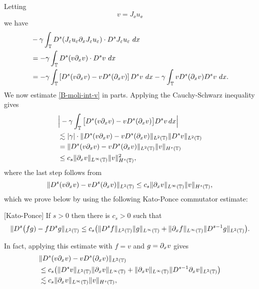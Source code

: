 Letting 
%
\begin{equation} 
\label{v-Je-ue}
v=J_\ee u_\ee
\end{equation}
%
%
we have
%
\begin{equation} 
\begin{split}
\label{B-moli-int-v}
& -  \gamma \int_{\mathbb{T}}   D^s (J_{\varepsilon} u_{\varepsilon} \partial_x J_\varepsilon u_\varepsilon)
\cdot D^s
J_{\varepsilon}u_\varepsilon \ dx  
\\
& = - \gamma \int_{\mathbb{T}}
D^s(v \partial_x v) \cdot   D^s v \ dx
\\
& = - \gamma \int_{\mathbb{T}}
\left [ 
D^s(v\partial_x v)  -  v D^s (\partial_xv)
\right ] 
D^s v \ dx - \gamma \int_{\mathbb{T}}
v D^s (\partial_xv)
D^s v \ dx.
\end{split}
\end{equation}
%
%
%
We now estimate \eqref{B-moli-int-v} in parts. Applying the Cauchy-Schwarz inequality gives
%
\begin{equation} 
\label{int1-est-calc2}
\begin{split}
& \Big|
- \gamma \int_{\mathbb{T}}
\big[ 
D^s(v\partial_x v)  -  v D^s (\partial_xv)
\big]
D^s v   \, dx
\Big|
\\
& \lesssim
|\gamma| \cdot \|
D^s(v\partial_x v)  -  v D^s (\partial_xv)
\|_{L^2(\mathbb{T})}
\|
D^s v 
\|_{L^2(\mathbb{T})}
\\
& = 
  \|
D^s(v\partial_x v)  -  v D^s (\partial_xv)
\|_{L^2(\mathbb{T})}
\|
v
\|_{H^s(\mathbb{T})}
\\
&\le c_s \| \partial_x v \|_{L^\infty(\mathbb{T})} 
\| v \|_{H^s(\mathbb{T})}^2,
\end{split}
\end{equation}
%
where the last step follows from 
%
\begin{equation} 
\label{int1-est-calc3}
\| D^s(v\partial_x v)  -  v D^s (\partial_xv) \|_{L^2(\mathbb{T})}
\le
c_s    \| \partial_x v \|_{L^\infty(\mathbb{T})} 
\| v \|_{H^s(\mathbb{T})},
\end{equation}
which we prove below by using the following Kato-Ponce commutator 
estimate:  
\begin{lemma} 
\label{KP-lemma}
[Kato-Ponce]
If  $s>0$ then there is $c_s>0$ such that 
%
\begin{equation} 
\label{KP-com-est}
\| D^{s} \big(fg) -  f D^s g\|_{L^2(\mathbb{T})}
\le
c_s\big(
\| D^{s}f \|_{L^2(\mathbb{T})}    \| g \|_{L^\infty(\mathbb{T})} 
+
\| \partial_xf \|_{L^\infty(\mathbb{T})}    \| D^{s-1}g \|_{L^2(\mathbb{T})}   
\big).
\end{equation}
%
\end{lemma}
%
%
In fact, applying  this estimate with $f=v$ and $g=\partial_xv$ gives 
%
\begin{equation} 
\label{int1-est-calc4}
\begin{split}
& \| D^s(v\partial_x v)  -  v D^s (\partial_xv) \|_{L^2(\mathbb{T})}
\\
& \le
{c_s} \big(
\| D^{s}v \|_{L^2(\mathbb{T})}    \| \partial_x v \|_{L^\infty(\mathbb{T})} 
+
\| \partial_xv \|_{L^\infty(\mathbb{T})}    \| D^{s-1}\partial_x v \|_{L^2(\mathbb{T})}   
\big)
\\
& \lesssim {c_s}    \| \partial_x v \|_{L^\infty(\mathbb{T})} 
\| v \|_{H^s(\mathbb{T})}, 
\end{split}
\end{equation}
